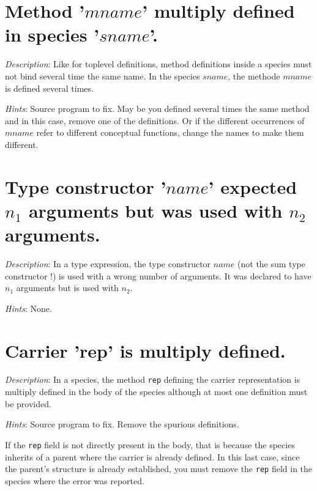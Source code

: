 \section*{Method '$mname$' multiply defined in species '$sname$'.}

{\em Description}: Like for toplevel definitions, method definitions
inside a species must not bind several time the same name. In the
species $sname$, the methode $mname$ is defined several times.

{\em Hints}: Source program to fix. May be you defined several times
the same method and in this case, remove one of the definitions. Or if
the different occurrences of $mname$ refer to different conceptual
functions, change the names to make them different.



\section*{Type constructor '$name$' expected $n_1$ arguments but was
  used with $n_2$ arguments.}

{\em Description}: In a type expression, the type constructor $name$
(not the sum type constructor !) is used with a wrong number of
arguments. It was declared to have $n_1$ arguments but is used with
$n_2$.

{\em Hints}: None.



\section*{Carrier 'rep' is multiply defined.}

{\em Description}: In a species, the method {\tt rep} defining the
carrier representation is multiply defined in the body of the species
although at most one definition must be provided.

{\em Hints}: Source program to fix. Remove the spurious definitions.

If the {\tt rep} field is not directly present in the
body, that is because the species inherits of a parent where the
carrier is already defined. In this last case, since the parent's
structure is already established, you must remove the {\tt rep} field
in the species where the error was reported.



